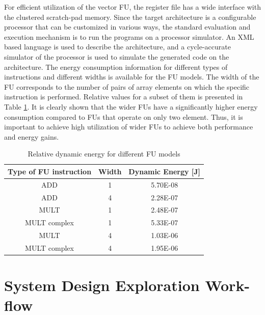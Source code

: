 For efficient utilization of the vector FU, the register file has a wide interface with the clustered scratch-pad memory. 
Since the target architecture is a configurable processor that can be customized in various ways, the standard evaluation and execution mechanism is to run the programs on a processor simulator. 
An XML based language is used to describe the architecture, and a cycle-accurate simulator of the processor is used to simulate the generated code on the architecture. 
The energy consumption information for different types of instructions and different widths is available for the FU models.
The width of the FU corresponds to the number of pairs of array elements on which the specific instruction is performed.
Relative values for a subset of them is presented in Table \ref{tab:models2}. 
It is clearly shown that the wider FUs have a significantly higher energy consumption compared to FUs that operate on only two element.
Thus, it is important to achieve high utilization of wider FUs to achieve both performance and energy gains.

\begin{table}
\caption{Relative dynamic energy for different FU models}
\label{tab:models2}{
	\begin{tabular}{|c|c|c|}
		\hline
		\textbf{Type of FU instruction} & \textbf{Width} & \textbf{Dynamic Energy [J]} \\ 
		\hline 
		ADD  & 1 & 5.70E-08 \\ 
		\hline
		ADD  & 4 & 2.28E-07 \\ 
		\hline
		MULT  & 1 & 2.48E-07 \\ 
		\hline
	 	MULT complex  & 1 & 5.33E-07 \\ 
		\hline
		MULT  & 4 & 1.03E-06 \\ 
		\hline
		MULT complex  & 4 & 1.95E-06 \\ 
		\hline
		\end{tabular}}	
\end{table}

\section{System Design Exploration Work-flow}
\label{sec:methodologyD}

